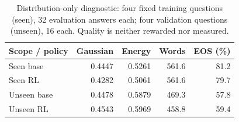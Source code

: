\begin{table}[htbp]
\centering\small
\caption{Distribution-only diagnostic: four fixed training questions (seen), 32 evaluation answers each; four validation questions (unseen), 16 each. Quality is neither rewarded nor measured.}\label{tab:diagnostic-new}
\begin{tabular}{@{}lrrrr@{}}
\toprule
Scope / policy & Gaussian & Energy & Words & EOS (\%)\\
\midrule
Seen base & 0.4447 & 0.5261 & 561.6 & 81.2\\
Seen RL & 0.4282 & 0.5061 & 561.6 & 79.7\\
Unseen base & 0.4478 & 0.5879 & 469.3 & 57.8\\
Unseen RL & 0.4543 & 0.5969 & 458.8 & 59.4\\
\bottomrule
\end{tabular}
\end{table}
